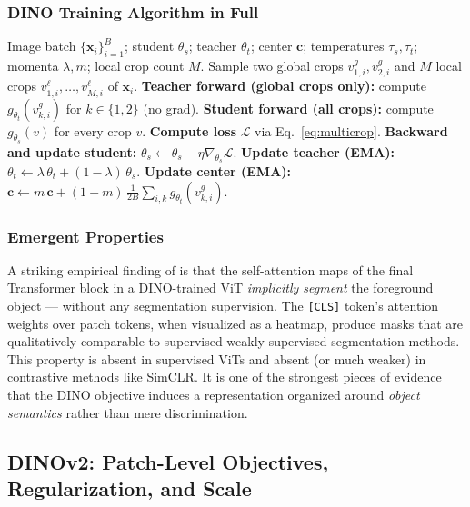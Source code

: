 \documentclass[11pt,a4paper]{article}
\newcommand{\vect}[1]{\mathbf{#1}}
\newcommand{\loss}{\mathcal{L}}
\newcommand{\thetaS}{\theta_{s}}
\newcommand{\thetaT}{\theta_{t}}
\newcommand{\gS}{g_{\thetaS}}
\newcommand{\gT}{g_{\thetaT}}
\begin{document}
\subsubsection{DINO Training Algorithm in Full}

\begin{algorithm}[H]
\caption{DINO training (one iteration)}
\label{alg:dino}
\begin{algorithmic}[1]
\Require Image batch $\{\vect{x}_{i}\}_{i=1}^{B}$; student $\thetaS$;
         teacher $\thetaT$; center $\vect{c}$; temperatures $\tau_{s},\tau_{t}$;
         momenta $\lambda,m$; local crop count $M$.
  \State Sample two global crops $v_{1,i}^{g},v_{2,i}^{g}$ and $M$ local
         crops $v_{1,i}^{\ell},\ldots,v_{M,i}^{\ell}$ of $\vect{x}_{i}$.
\EndFor
\State \textbf{Teacher forward (global crops only):}
       compute $\gT(v_{k,i}^{g})$ for $k\in\{1,2\}$ (no grad).
\State \textbf{Student forward (all crops):}
       compute $\gS(v)$ for every crop $v$.
\State \textbf{Compute loss} $\loss$ via Eq.~\eqref{eq:multicrop}.
\State \textbf{Backward and update student:}
       $\thetaS \leftarrow \thetaS - \eta \nabla_{\thetaS} \loss$.
\State \textbf{Update teacher (EMA):}
       $\thetaT \leftarrow \lambda\,\thetaT + (1-\lambda)\,\thetaS$.
\State \textbf{Update center (EMA):}
       $\vect{c} \leftarrow m\,\vect{c} + (1-m)\,\tfrac{1}{2B}\sum_{i,k} \gT(v_{k,i}^{g})$.
\end{algorithmic}
\end{algorithm}

\subsubsection{Emergent Properties}

A striking empirical finding of \citet{caron2021emerging} is that the
self-attention maps of the final Transformer block in a DINO-trained ViT
\emph{implicitly segment} the foreground object --- without any
segmentation supervision. The \texttt{[CLS]} token's attention weights
over patch tokens, when visualized as a heatmap, produce masks that are
qualitatively comparable to supervised weakly-supervised segmentation
methods. This property is absent in supervised ViTs and absent (or much
weaker) in contrastive methods like SimCLR. It is one of the strongest
pieces of evidence that the DINO objective induces a representation
organized around \emph{object semantics} rather than mere discrimination.

\subsection{DINOv2: Patch-Level Objectives, Regularization, and Scale}
\label{sec:dinov2}
\end{document}
